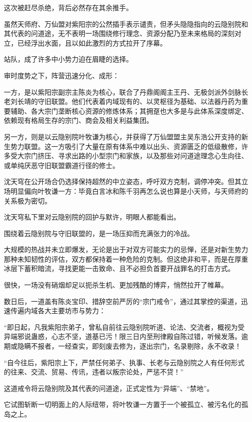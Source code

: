 这次被赶尽杀绝，背后必然存在其余推手。

虽然天师府、万仙盟对紫阳宗的公然插手表示谴责，但矛头隐隐指向的云隐别院和其代表的问道途，无不表明一场围绕修行理念、资源分配乃至未来格局的深刻对立，已经浮出水面，且以如此激烈的方式拉开了序幕。

站队，成了许多中小势力迫在眉睫的选择。

审时度势之下，阵营迅速分化、成形：

一方，是以紫阳宗副宗主陈炎为核心，联合了丹鼎阁阁主王丹、无极剑派外剑脉长老刘长靖的守旧联盟。他们代表着内域现有的、以灵枢径为基础、以法器丹药为重要辅助、各大宗门垄断核心资源的修炼体系；其拥趸也大多是与此体系深度绑定、依赖现有格局生存的宗门、商会及相关利益集团。

另一方，则是以云隐别院叶牧谦为核心，并获得了万仙盟盟主吴东浩公开支持的新生势力联盟。这一方吸引了大量在原有体系中难以出头、资源匮乏的低级散修，许多受大宗门挤压、寻求出路的小型宗门和家族，以及那些对问道途理念心生向往、或单纯厌恶守旧联盟霸道行径的修士。

沈天穹在公开场合仍选择保持超然的中立姿态，呼吁双方克制，调停冲突。但其立场明显偏向叶牧谦一方：毕竟白言冰和陈千羽再怎么说也算是小天师，与天师府的关系极为密切。

沈天穹私下里对云隐别院的回护与默许，明眼人都能看出。

\vspace{2em}

围绕着云隐别院与守旧联盟的，是一场压抑而充满张力的冷战。

大规模的热战并未立即爆发，无论是出于对双方可能实力的忌惮，还是对新生势力那种未知韧性的评估，双方都保持着一种危险的克制。但这绝非和平，而是在厚重冰层下蓄积暗流，寻找更能一击致命、且不必担负首要开战罪名的打击方式。

很快，一场没有硝烟却足以扼杀生机、更加残酷的博弈，悄然拉开了帷幕。

数日后，一道盖有陈炎宝印、措辞空前严厉的“宗门戒令”，通过其掌控的渠道，迅速传遍内域各大主要坊市与势力：

“即日起，凡我紫阳宗弟子，曾私自前往云隐别院听道、论法、交流者，概视为受异端邪说蛊惑，心志不坚，道基已污！限三日内至刑律殿自陈过错，听候发落。逾期或隐瞒不报者，一经查实，即刻废去修为，逐出宗门，名录剔除，永不收录！

“自今往后，紫阳宗上下，严禁任何弟子、执事、长老与云隐别院之人有任何形式的往来、交流、贸易、传讯，违者以叛宗论处，严惩不贷！”

这道戒令将云隐别院及其代表的问道途，正式定性为“异端”、“禁地”。

它试图斩断一切明面上的人际纽带，将叶牧谦一方置于一个被孤立、被污名化的孤岛之上。

